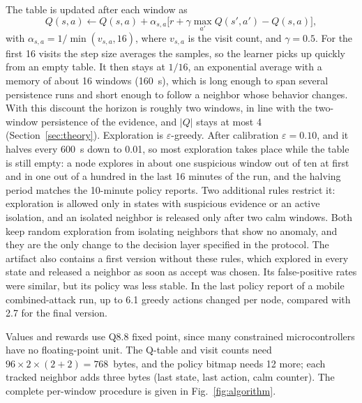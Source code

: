 The table is updated after each window as
\begin{equation}
 Q(s,a)\leftarrow Q(s,a)+\alpha_{s,a}\big[r+\gamma\max_{a'}Q(s',a')-Q(s,a)\big],
\end{equation}
with $\alpha_{s,a}=1/\min(v_{s,a},16)$, where $v_{s,a}$ is the visit count, and $\gamma=0.5$. For the first 16 visits the step size averages the samples, so the learner picks up quickly from an empty table. It then stays at $1/16$, an exponential average with a memory of about 16 windows (160~s), which is long enough to span several persistence runs and short enough to follow a neighbor whose behavior changes. With this discount the horizon is roughly two windows, in line with the two-window persistence of the evidence, and $|Q|$ stays at most 4 (Section~\ref{sec:theory}). Exploration is $\varepsilon$-greedy. After calibration $\varepsilon=0.10$, and it halves every 600~s down to 0.01, so most exploration takes place while the table is still empty: a node explores in about one suspicious window out of ten at first and in one out of a hundred in the last 16 minutes of the run, and the halving period matches the 10-minute policy reports. Two additional rules restrict it: exploration is allowed only in states with suspicious evidence or an active isolation, and an isolated neighbor is released only after two calm windows. Both keep random exploration from isolating neighbors that show no anomaly, and they are the only change to the decision layer specified in the protocol. The artifact also contains a first version without these rules, which explored in every state and released a neighbor as soon as accept was chosen. Its false-positive rates were similar, but its policy was less stable. In the last policy report of a mobile combined-attack run, up to 6.1 greedy actions changed per node, compared with 2.7 for the final version.

Values and rewards use Q8.8 fixed point, since many constrained microcontrollers have no floating-point unit. The Q-table and visit counts need $96\times2\times(2+2)=768$~bytes, and the policy bitmap needs 12 more; each tracked neighbor adds three bytes (last state, last action, calm counter). The complete per-window procedure is given in Fig.~\ref{fig:algorithm}.

